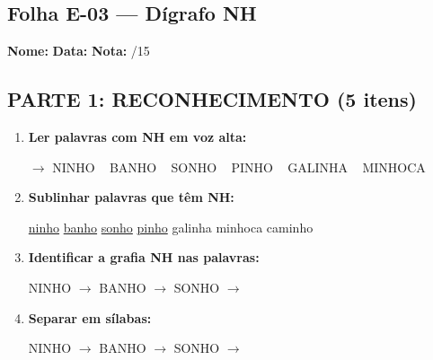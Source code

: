 \subsection{Folha E-03 --- Dígrafo NH}
\begin{exercicio}



\noindent\textbf{Nome:} \underline{\hspace{3.2cm}} \quad \textbf{Data:} \underline{\hspace{1.6cm}} \quad \textbf{Nota:} \underline{\hspace{0.9cm}}/15


\subsection*{PARTE 1: RECONHECIMENTO (5 itens)}

\begin{enumerate}

  \item \textbf{Ler palavras com NH em voz alta:}
  \begin{center}
  $\rightarrow$ NINHO ~ BANHO ~ SONHO ~ PINHO ~ GALINHA ~ MINHOCA
  \end{center}

  \item \textbf{Sublinhar palavras que têm NH:}

\begin{center}
  \uline{ninho} \quad \uline{banho} \quad \uline{sonho} \quad \uline{pinho} \quad galinha \quad minhoca \quad caminho
\end{center}

  \item \textbf{Identificar a grafia NH nas palavras:}
  \begin{center}
  NINHO $\rightarrow$ \underline{\hspace{1cm}} \quad BANHO $\rightarrow$ \underline{\hspace{1cm}} \quad SONHO $\rightarrow$ \underline{\hspace{1cm}}
  \end{center}

  \item \textbf{Separar em sílabas:}
  \begin{center}
  NINHO $\rightarrow$ \underline{\hspace{1.2cm}} \quad BANHO $\rightarrow$ \underline{\hspace{1.2cm}} \quad SONHO $\rightarrow$ \underline{\hspace{1.2cm}}
  \end{center}


\end{enumerate}
\end{exercicio}
